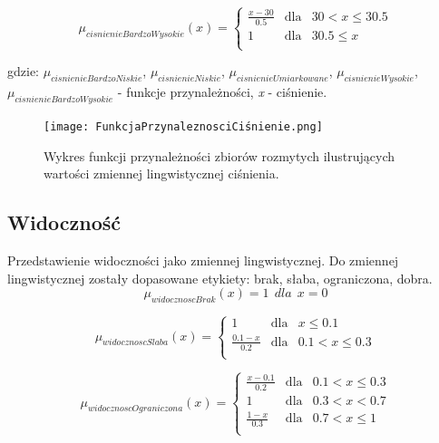 \documentclass{classrep}
\begin{document}
\begin{equation}
\mu _{cisnienieBardzoWysokie}(x) = \left\{ \begin{array}{rcl}
\frac{x - 30}{0.5} & \mbox{dla} & 30 < x \leq 30.5\\
1 & \mbox{dla} & 30.5 \leq x\\
\end{array}\right.
\end{equation}


gdzie: \(\mu _{cisnienieBardzoNiskie}\), \(\mu _{cisnienieNiskie}\), \(\mu _{cisnienieUmiarkowane}\), \(\mu _{cisnienieWysokie}\), \(\mu _{cisnienieBardzoWysokie}\) - funkcje przynależności, \textit{x} - ciśnienie.

\begin{figure}[h!]
\centering
\texttt{[image: FunkcjaPrzynaleznosciCiśnienie.png]}
\vspace{-0.3cm}
\caption{Wykres funkcji przynależności zbiorów rozmytych ilustrujących wartości zmiennej lingwistycznej ciśnienia. }
\label{rysunek do eksperymentu 1 wariantu 1}
\end{figure}
\newpage



\subsection{Widoczność}
Przedstawienie widoczności jako zmiennej lingwistycznej. Do zmiennej lingwistycznej zostały dopasowane etykiety: brak, słaba, ograniczona, dobra.
\begin{equation}
\mu _{widocznoscBrak}(x) = 1 \ \ dla \ \ x = 0
\end{equation}

\begin{equation}
\mu _{widocznoscSlaba}(x) = \left\{ \begin{array}{rcl}
1 & \mbox{dla} & x \leq 0.1 \\
\frac{0.1 - x}{0.2} & \mbox{dla} & 0.1 < x \leq 0.3\\
\end{array}\right.
\end{equation}

\begin{equation}
\mu _{widocznoscOgraniczona}(x) = \left\{ \begin{array}{rcl}
\frac{x - 0.1}{0.2} & \mbox{dla} & 0.1 < x \leq 0.3\\
1 & \mbox{dla} & 0.3 < x < 0.7\\
\frac{1 - x}{0.3} & \mbox{dla} & 0.7 < x \leq1\\
\end{array}\right.
\end{equation}
\end{document}
